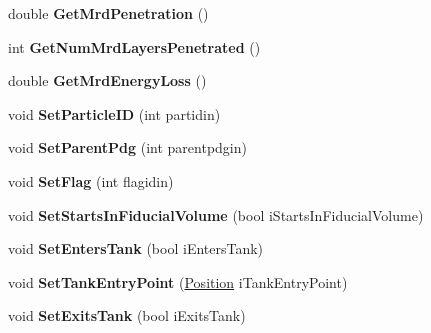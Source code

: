 \begin{DoxyCompactItemize}
\item 
\hypertarget{classMCParticle_a3d260af122ff90824de2e2be7f672f07}{
double {\bfseries GetMrdPenetration} ()}
\label{classMCParticle_a3d260af122ff90824de2e2be7f672f07}

\item 
\hypertarget{classMCParticle_afa08a1cb74a4b0b642f0b62c04114976}{
int {\bfseries GetNumMrdLayersPenetrated} ()}
\label{classMCParticle_afa08a1cb74a4b0b642f0b62c04114976}

\item 
\hypertarget{classMCParticle_ac8325eb8dd7e2d10b6b406dfcd6b31af}{
double {\bfseries GetMrdEnergyLoss} ()}
\label{classMCParticle_ac8325eb8dd7e2d10b6b406dfcd6b31af}

\item 
\hypertarget{classMCParticle_ab3f8776c846fcc1c82f2d9083beaf07f}{
void {\bfseries SetParticleID} (int partidin)}
\label{classMCParticle_ab3f8776c846fcc1c82f2d9083beaf07f}

\item 
\hypertarget{classMCParticle_a835ce089d630c4624a3060980450ca2c}{
void {\bfseries SetParentPdg} (int parentpdgin)}
\label{classMCParticle_a835ce089d630c4624a3060980450ca2c}

\item 
\hypertarget{classMCParticle_ace8eaad4c1fd7398fb5bda3316b5395b}{
void {\bfseries SetFlag} (int flagidin)}
\label{classMCParticle_ace8eaad4c1fd7398fb5bda3316b5395b}

\item 
\hypertarget{classMCParticle_a2a42a4f6ef9af8a6158e422680a57b47}{
void {\bfseries SetStartsInFiducialVolume} (bool iStartsInFiducialVolume)}
\label{classMCParticle_a2a42a4f6ef9af8a6158e422680a57b47}

\item 
\hypertarget{classMCParticle_a1fb1b9c4206de10c602b1095e6428578}{
void {\bfseries SetEntersTank} (bool iEntersTank)}
\label{classMCParticle_a1fb1b9c4206de10c602b1095e6428578}

\item 
\hypertarget{classMCParticle_a2cfded14729766192df1b9770edba92a}{
void {\bfseries SetTankEntryPoint} (\hyperlink{classPosition}{Position} iTankEntryPoint)}
\label{classMCParticle_a2cfded14729766192df1b9770edba92a}

\item 
\hypertarget{classMCParticle_a702069712afdc032362de66c133c0165}{
void {\bfseries SetExitsTank} (bool iExitsTank)}
\label{classMCParticle_a702069712afdc032362de66c133c0165}


\end{DoxyCompactItemize}
